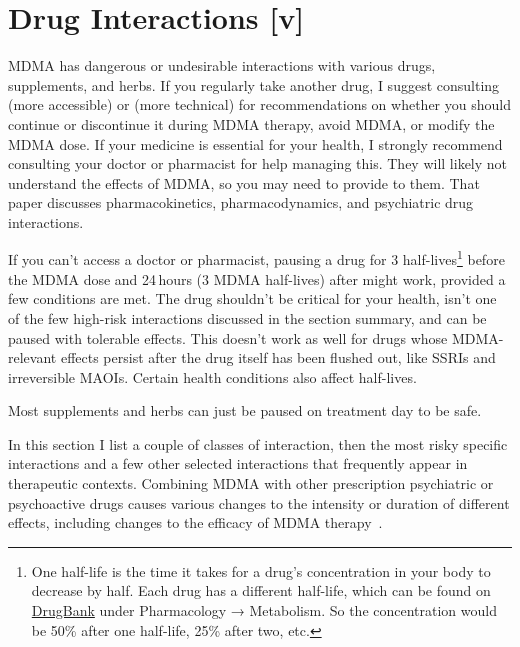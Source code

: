 \documentclass[11pt,oneside]{book}
\let\cite\parencite
\begin{document}
\section{Drug Interactions [v]}
MDMA has dangerous or undesirable interactions with various drugs, supplements, and herbs. If you regularly take another drug, I suggest consulting \textcite{liechtiInteractions,spiritMemberProgram} (more accessible) or \textcite{sarparastDrugInteractions} (more technical) for recommendations on whether you should continue or discontinue it during MDMA therapy, avoid MDMA, or modify the MDMA dose. If your medicine is essential for your health, I strongly recommend consulting your doctor or pharmacist for help managing this. They will likely not understand the effects of MDMA, so you may need to provide \textcite{sarparastDrugInteractions} to them. That paper discusses pharmacokinetics, pharmacodynamics, and psychiatric drug interactions.

If you can't access a doctor or pharmacist, pausing a drug for 3 half-lives\footnote{One half-life is the time it takes for a drug's concentration in your body to decrease by half. Each drug has a different half-life, which can be found on \href{https://go.drugbank.com}{DrugBank} under Pharmacology → Metabolism. So the concentration would be 50\% after one half-life, 25\% after two, etc.} before the MDMA dose and 24\,hours (3 MDMA half-lives) after might work, provided a few conditions are met. The drug shouldn't be critical for your health, isn't one of the few high-risk interactions discussed in the section summary, and can be paused with tolerable effects. This doesn't work as well for drugs whose MDMA-relevant effects persist after the drug itself has been flushed out, like SSRIs and irreversible MAOIs. Certain health conditions also affect half-lives.

Most supplements and herbs can just be paused on treatment day to be safe.

In this section I list a couple of classes of interaction, then the most risky specific interactions and a few other selected interactions that frequently appear in therapeutic contexts. Combining MDMA with other prescription psychiatric or psychoactive drugs causes various changes to the intensity or duration of different effects, including changes to the efficacy of MDMA therapy~\cite{sarparastDrugInteractions}.
\end{document}
